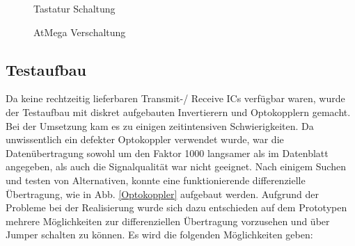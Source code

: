 \begin{figure}[H]
    \centering    
    \caption{Tastatur Schaltung}
    \label{Tastatur}
\end{figure}


\begin{figure}[H]
    \centering    
    \caption{AtMega Verschaltung}
    \label{AtMega}
\end{figure}


\subsection{Testaufbau}


Da keine rechtzeitig lieferbaren Transmit-/ Receive ICs verfügbar waren, wurde der Testaufbau mit diskret aufgebauten Invertierern und Optokopplern gemacht.
Bei der Umsetzung kam es zu einigen zeitintensiven Schwierigkeiten. Da unwissentlich ein defekter Optokoppler verwendet wurde, war die Datenübertragung sowohl 
um den Faktor 1000 langsamer als im Datenblatt angegeben, als auch die Signalqualität war nicht geeignet. 
Nach einigem Suchen und testen von Alternativen, konnte eine funktionierende differenzielle Übertragung, wie in Abb. \ref{Optokoppler} 
aufgebaut werden. 
Aufgrund der Probleme bei der Realisierung wurde sich dazu entschieden auf dem Prototypen mehrere Möglichkeiten zur differenziellen Übertragung vorzusehen 
und über Jumper schalten zu können. 
Es wird die folgenden Möglichkeiten geben:

